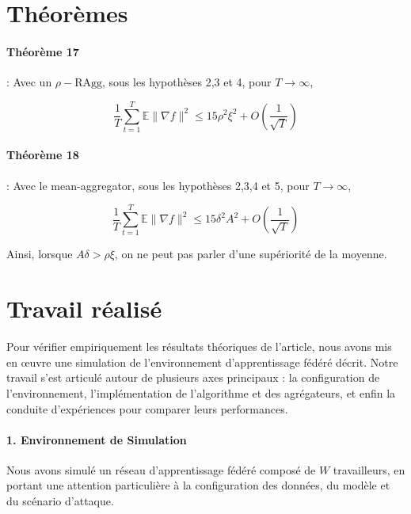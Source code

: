\documentclass{article}
\begin{document}
\section*{Théorèmes}

\paragraph{Théorème 17} : Avec un $\rho-\mathrm{RAgg}$, sous les hypothèses 2,3 et 4, pour $T\rightarrow \infty$,

$$\dfrac{1}{T}\sum_{t=1}^T \mathbb E\|\nabla f\|^2 \leq 15 \rho^2\xi^2 + O\left(\dfrac{1}{\sqrt{T}}\right)$$

\paragraph{Théorème 18} : Avec le mean-aggregator, sous les hypothèses 2,3,4 et 5, pour $T\rightarrow \infty$,

$$\dfrac{1}{T}\sum_{t=1}^T \mathbb E\|\nabla f\|^2 \leq 15 \delta^2 A^2 + O\left(\dfrac{1}{\sqrt{T}}\right)$$

Ainsi, lorsque $A\delta > \rho \xi$, on ne peut pas parler d'une supériorité de la moyenne.


\section*{Travail réalisé}

Pour vérifier empiriquement les résultats théoriques de l'article, nous avons mis en œuvre une simulation de l'environnement d'apprentissage fédéré décrit. Notre travail s'est articulé autour de plusieurs axes principaux : la configuration de l'environnement, l'implémentation de l'algorithme et des agrégateurs, et enfin la conduite d'expériences pour comparer leurs performances.

\paragraph{1. Environnement de Simulation}
Nous avons simulé un réseau d'apprentissage fédéré composé de $W$ travailleurs, en portant une attention particulière à la configuration des données, du modèle et du scénario d'attaque.
\end{document}
